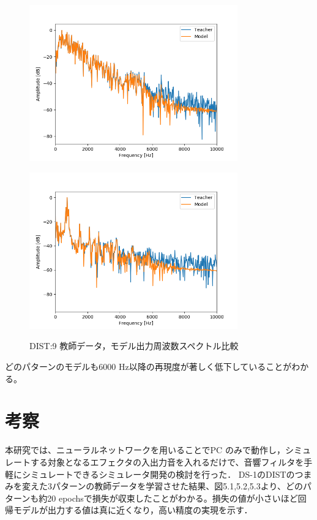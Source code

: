 \documentclass{jreport}		%
\begin{document}
\begin{figure}[htbp]
 \begin{minipage}{0.5\hsize}
 \begin{center}
  \includegraphics[width=90mm]{gain10_fft_hikaku.png}
 \end{center}
 \label{fig:one}
 \end{minipage}
 \begin{minipage}{0.5\hsize}
 \begin{center}
  \includegraphics[width=90mm]{gain10_fft_hikaku2.png}
 \end{center}
 \label{fig:two}
 \end{minipage}
 \caption{DIST:9 教師データ，モデル出力周波数スペクトル比較}
\end{figure}

どのパターンのモデルも6000 Hz以降の再現度が著しく低下していることがわかる。

\chapter{考察}
本研究では、ニューラルネットワークを用いることでPC のみで動作し，シミュレートする対象となるエフェクタの入出力音を入れるだけで、音響フィルタを手軽にシミュレートできるシミュレータ開発の検討を行った．
DS-1のDISTのつまみを変えた3パターンの教師データを学習させた結果、図5.1,5.2,5.3より、どのパターンも約20 epochsで損失が収束したことがわかる。損失の値が小さいほど回帰モデルが出力する値は真に近くなり，高い精度の実現を示す．
\end{document}
